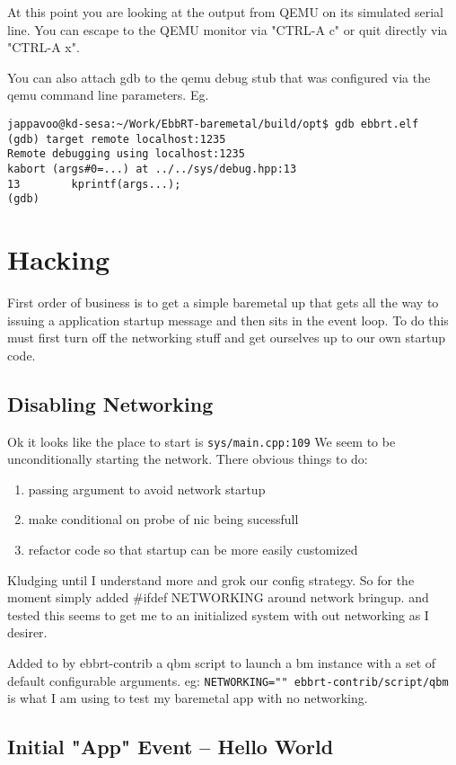 \documentclass[11pt]{report}
\begin{document}
At this point you are looking at the output from QEMU on its simulated serial line.  You can escape to the QEMU monitor via "CTRL-A c" or quit directly via "CTRL-A x".  

You can also attach gdb to the qemu debug stub that was configured via the qemu command line parameters.
Eg.
\begin{verbatim}
jappavoo@kd-sesa:~/Work/EbbRT-baremetal/build/opt$ gdb ebbrt.elf
(gdb) target remote localhost:1235
Remote debugging using localhost:1235
kabort (args#0=...) at ../../sys/debug.hpp:13
13        kprintf(args...);
(gdb) 
\end{verbatim}

\chapter{Hacking}

First order of business is to get a simple baremetal
up that gets all the way to issuing a application
startup message and then sits in the event loop.
To do this must first turn off the networking stuff
and get ourselves up to our own startup code.

\section{Disabling Networking}

Ok it looks like the place to start is {\tt sys/main.cpp:109}
We seem to be unconditionally starting the network. 
There obvious things to do:
\begin{enumerate}
\item passing argument to avoid network startup
\item make conditional on probe of nic being sucessfull
\item refactor code so that startup can be more easily customized
\end{enumerate}
Kludging until I understand more and grok our config strategy.
So for the moment simply added \#ifdef NETWORKING around network bringup.
and tested this seems to get me to an initialized system with out networking
as I desirer.   

Added  to by ebbrt-contrib a qbm script to launch a bm instance with
a set of default configurable arguments. eg:
{\tt NETWORKING="" ebbrt-contrib/script/qbm} is what I am using to test 
my baremetal app with no networking.

\section{Initial "App" Event -- Hello World}
\end{document}
